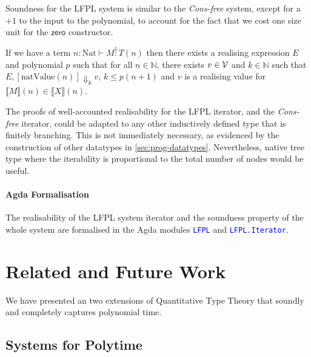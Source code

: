 \documentclass[acmsmall,review,screen,anonymous]{acmart}
\newcommand{\tyNat}{\mathrm{Nat}}
\newcommand{\conZero}{\mathsf{zero}}
\newcommand{\AgdaModule}[1]{\textcolor{blue}{\tt #1}}
\begin{document}
Soundness for the LFPL system is similar to the \emph{Cons-free}
system, except for a $+1$ to the input to the polynomial, to account
for the fact that we cost one size unit for the $\conZero$
constructor.
\begin{theorem}
  \label{thm:lfpl-soundness}
  If we have a term $n : \tyNat \vdash M \stackrel1: T(n)$ then there
  exists a realising expression $E$ and polynomial $p$ such that for
  all $n \in \mathbb{N}$, there exists $v \in \mathcal{V}$ and
  $k \in \mathbb{N}$ such that
  $E, [\mathrm{natValue}(n)] \Downarrow_k v$, $k \leq p(n+1)$ and $v$
  is a realising value for
  $\llbracket M \rrbracket(n) \in \llbracket X \rrbracket(n)$.
\end{theorem}

The proofs of well-accounted realisability for the LFPL iterator, and
the \emph{Cons-free} iterator, could be adapted to any other
inductively defined type that is finitely branching. This is not
immediately necessary, as evidenced by the construction of other
datatypes in \autoref{sec:prog-datatypes}. Nevertheless, native tree
type where the iterability is proportional to the total number of
nodes would be useful.

\paragraph{Agda Formalisation} The realisability of the LFPL system
iterator and the soundness property of the whole system are formalised
in the Agda modules \AgdaModule{LFPL} and \AgdaModule{LFPL.Iterator}.

\section{Related and Future Work}
\label{sec:conclusion}

We have presented an two extensions of Quantitative Type Theory that
soundly and completely captures polynomial time.

\subsection{Systems for Polytime}
\end{document}
